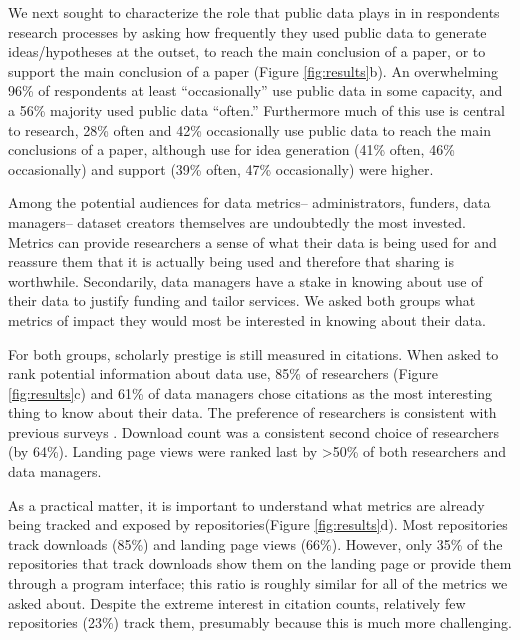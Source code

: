 \documentclass[english]{article}
\begin{document}
We next sought to characterize the role that public data plays in in respondents research processes by asking how frequently they used public data to generate ideas/hypotheses at the outset, to reach the main conclusion of a paper, or to support the main conclusion of a paper (Figure \ref{fig:results}b).
An overwhelming 96\% of respondents at least ``occasionally'' use public data in some capacity, and a 56\% majority used public data ``often.''
Furthermore much of this use is central to research, 28\% often and 42\% occasionally use public data to reach the main conclusions of a paper, although use for idea generation (41\% often, 46\% occasionally) and support (39\% often, 47\% occasionally) were higher.



Among the potential audiences for data metrics-- administrators, funders, data managers-- dataset creators themselves are undoubtedly the most invested.
Metrics can provide researchers a sense of what their data is being used for and reassure them that it is actually being used and therefore that sharing is worthwhile.
Secondarily, data managers have a stake in knowing about use of their data to justify funding and tailor services.
We asked both groups what metrics of impact they would most be interested in knowing about their data. 

For both groups, scholarly prestige is still measured in citations.
When asked to rank potential information about data use, 85\% of researchers (Figure \ref{fig:results}c) and 61\% of data managers chose citations as the most interesting thing to know about their data. 
The preference of researchers is consistent with previous surveys \cite{kratz_researcher_2015}.
Download count was a consistent second choice of researchers (by 64\%). 
Landing page views were ranked last by >50\% of both researchers and data managers.

As a practical matter, it is important to understand what metrics are already being tracked and exposed by repositories(Figure \ref{fig:results}d). 
Most repositories track downloads (85\%) and landing page views (66\%). 
However, only 35\% of the repositories that track downloads show them on the landing page or provide them through a program interface; this ratio is roughly similar for all of the metrics we asked about. 
Despite the extreme interest in citation counts, relatively few repositories (23\%) track them, presumably because this is much more challenging. 
\end{document}
